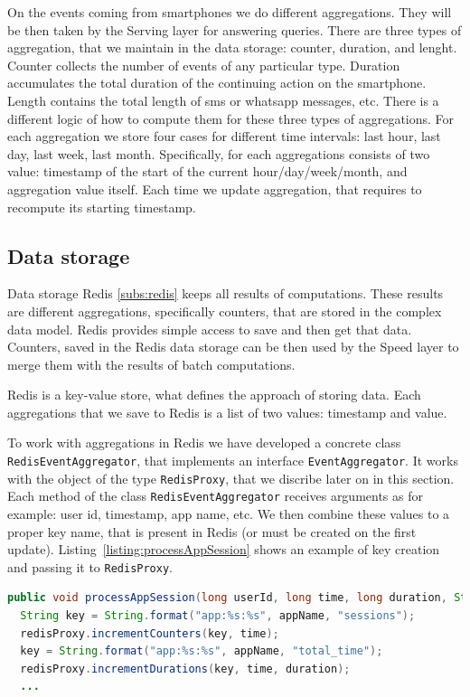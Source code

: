 On the events coming from smartphones we do different aggregations.
They will be then taken by the Serving layer for answering queries.
There are three types of aggregation, that we maintain in the data storage: counter, duration, and lenght.
Counter collects the number of events of any particular type.
Duration accumulates the total duration of the continuing action on the smartphone.
Length contains the total length of sms or whatsapp messages, etc.
There is a different logic of how to compute them for these three types of aggregations. 
For each aggregation we store four cases for different time intervals: last hour, last day, last week, last month.
Specifically, for each aggregations consists of two value: timestamp of the start of the current hour/day/week/month, and aggregation value itself.
Each time we update aggregation, that requires to recompute its starting timestamp.

\subsection{Data storage}

Data storage Redis \ref{subs:redis} keeps all results of computations.
These results are different aggregations, specifically counters, that are stored in the complex data model.
Redis provides simple access to save and then get that data.
Counters, saved in the Redis data storage can be then used by the Speed layer to merge them with the results of batch computations.

Redis is a key-value store, what defines the approach of storing data.
Each aggregations that we save to Redis is a list of two values: timestamp and value.

To work with aggregations in Redis we have developed a concrete class \lstinline{RedisEventAggregator}, that implements an interface \lstinline{EventAggregator}.
It works with the object of the type \lstinline{RedisProxy}, that we discribe later on in this section.
Each method of the class \lstinline{RedisEventAggregator} receives arguments as for example: user id, timestamp, app name, etc.
We then combine these values to a proper key name, that is present in Redis (or must be created on the first update).
Listing~\ref{listing:processAppSession} shows an example of key creation and passing it to \lstinline{RedisProxy}.

\begin{lstlisting}[float=h, caption=Example of key creation for aggregation update., label=listing:processAppSession, language=Java]
public void processAppSession(long userId, long time, long duration, String appName) {
  String key = String.format("app:%s:%s", appName, "sessions");
  redisProxy.incrementCounters(key, time);
  key = String.format("app:%s:%s", appName, "total_time");
  redisProxy.incrementDurations(key, time, duration);
  ...
\end{lstlisting}

